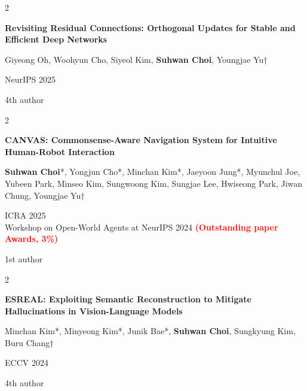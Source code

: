 \documentclass[10pt, letterpaper]{article}
\newenvironment{pubentry}[2][]{
    \onecolentry
    \def\secondColumn{#2}
    \setcolumnwidth{\fill, 2 cm}
    \begin{paracol}{2}
}{
    \switchcolumn \raggedleft \secondColumn
    \end{paracol}
    \endonecolentry
} %
\let\hrefWithoutArrow\href
\renewcommand{\href}[2]{\hrefWithoutArrow{#1}{\ifthenelse{\equal{#2}{}}{ }{#2 }\raisebox{.15ex}{\footnotesize \faExternalLink*}}}
\begin{document}
\vspace{0.2 cm}

\begin{samepage}
    \begin{pubentry}{
            4th author
        }
        \textbf{Revisiting Residual Connections: Orthogonal Updates for Stable and Efficient Deep Networks}
        
        \vspace{0.10 cm}
        
        \small Giyeong Oh, Woohyun Cho, Siyeol Kim, \textbf{Suhwan Choi}, Youngjae Yu†
        
        \vspace{0.10 cm}
        
        NeurIPS 2025
    \end{pubentry}
\end{samepage}

\vspace{0.2 cm}

\begin{samepage}
    \begin{pubentry}{
            1st author
        }
        \textbf{CANVAS: Commonsense-Aware Navigation System for Intuitive Human-Robot Interaction} \href{https://worv-ai.github.io/canvas/}{[Website]}
        
        \vspace{0.10 cm}
        
        \small \textbf{Suhwan Choi}*, Yongjun Cho*, Minchan Kim*, Jaeyoon Jung*, Myunchul Joe, Yubeen Park, Minseo Kim, Sungwoong Kim, Sungjae Lee, Hwiseong Park, Jiwan Chung, Youngjae Yu†
        
        \vspace{0.10 cm}
        
        ICRA 2025 \\
        Workshop on Open-World Agents at NeurIPS 2024 \textcolor{red}{\textbf{(Outstanding paper Awards, 3\%)}}
    \end{pubentry}
\end{samepage}

\vspace{0.2 cm}

\begin{samepage}
    \begin{pubentry}{
            4th author
        }
        \textbf{ESREAL: Exploiting Semantic Reconstruction to Mitigate Hallucinations in Vision-Language Models}
        
        \vspace{0.10 cm}
        
        \small Minchan Kim*, Minyeong Kim*, Junik Bae*, \textbf{Suhwan Choi}, Sungkyung Kim, Buru Chang†
        
        \vspace{0.10 cm}
        
        ECCV 2024
    \end{pubentry}
\end{samepage}
\end{document}
